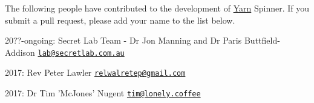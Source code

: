 The following people have contributed to the development of \hyperlink{a00045}{Yarn} Spinner. If you submit a pull request, please add your name to the list below.


\begin{DoxyItemize}
\item 20??-\/ongoing\-: Secret Lab Team -\/ Dr Jon Manning and Dr Paris Buttfield-\/\-Addison \href{mailto:lab@secretlab.com.au}{\tt lab@secretlab.\-com.\-au}
\item 2017\-: Rev Peter Lawler \href{mailto:relwalretep@gmail.com}{\tt relwalretep@gmail.\-com}
\item 2017\-: Dr Tim 'Mc\-Jones' Nugent \href{mailto:tim@lonely.coffee}{\tt tim@lonely.\-coffee} 
\end{DoxyItemize}